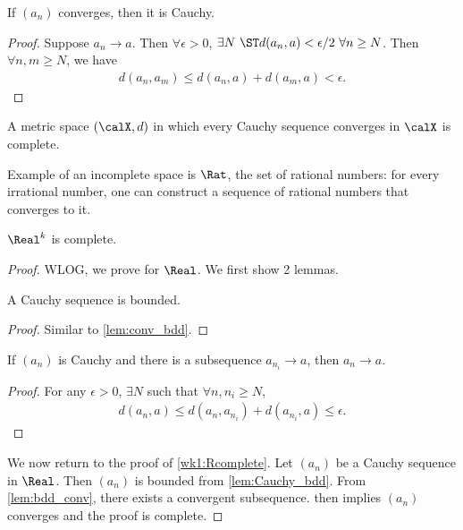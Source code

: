 \documentclass[../aipt.tex]{subfiles}
\begin{document}
\begin{Lemma}
If $(a_n)$ converges, then it is Cauchy.
\end{Lemma}
\begin{proof}
Suppose $a_n\to a$. Then $\forall \epsilon >0$, $\exists N\ \ST d(a_n,a) < \epsilon/2\ \forall n\geq N$. Then $\forall n,m \geq N$, we have
\begin{align*}
d(a_n, a_m) \leq d(a_n,a) + d(a_m,a) < \epsilon.
\end{align*}
\end{proof}

\begin{Definition}
A metric space $(\calX, d)$ in which every Cauchy sequence converges in $\calX$ is complete.
\end{Definition}

Example of an incomplete space is $\Rat$, the set of rational numbers: for every irrational number, one can construct a sequence of rational numbers that converges to it.


\begin{Theorem}\label{wk1:Rcomplete}
$\Real^k$ is complete.
\end{Theorem}
\begin{proof}
WLOG, we prove for $\Real$. We first show 2 lemmas.

\begin{Lemma}\label{lem:Cauchy_bdd}
A Cauchy sequence is bounded.
\end{Lemma}
\begin{proof}
Similar to \cref{lem:conv_bdd}.
\end{proof}

\begin{Lemma}\label{lem:Cauchy_sub}
If $(a_n)$ is Cauchy and there is a subsequence $a_{n_i} \to a$, then $a_n \to a$.
\end{Lemma}
\begin{proof}
For any $\epsilon > 0$, $\exists N$ such that $\forall n, n_i \geq N$,
\begin{align*}
d(a_n, a) \leq d(a_n, a_{n_i}) + d(a_{n_i},a) \leq \epsilon.
\end{align*}
\end{proof}

We now return to the proof of \cref{wk1:Rcomplete}. Let $(a_n)$ be a Cauchy sequence in $\Real$. Then $(a_n)$ is bounded from \cref{lem:Cauchy_bdd}. From \cref{lem:bdd_conv}, there exists a convergent subsequence.  then implies $(a_n)$ converges and the proof is complete.
\end{proof}

%

\end{document}
